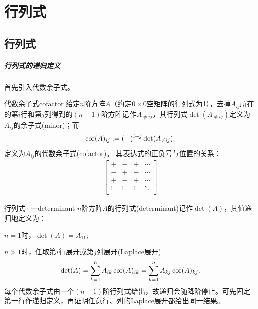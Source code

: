 \chapter{行列式}

\section{行列式}

\paragraph{行列式的递归定义}

首先引入代数余子式。

\begin{definition}{代数余子式}{cofactor}
	给定$n$阶方阵$A$（约定$0 \times 0$空矩阵的行列式为1），去掉$A_{ij}$所在的第$i$行和第$j$列得到的$(n - 1)$阶方阵记作$A_{\neq ij}$，其行列式$\det(A_{\neq ij})$定义为$A_{ij}$的余子式(minor)；而
	\begin{align}
		\operatorname{cof}(A)_{ij} := (-)^{i+j}\det(A_{\neq ij}).
	\end{align}
	定义为$A_{ij}$的代数余子式(cofactor)。
	其表达式的正负号与位置的关系：
	\begin{align*}
		\begin{bmatrix}
			+&-&+&\cdots\\
			-&+&-&\cdots\\
			+&-&+&\cdots\\
			\vdots&\vdots&\vdots&\ddots\\
		\end{bmatrix}
	\end{align*}
\end{definition}
\begin{definition}{行列式·一}{determinant}
	$n$阶方阵$A$的行列式(determinant)记作$\det(A)$，其值递归地定义为：
	\begin{compactenum}
		\item $n = 1$时，$\det(A) = A_{11};$
		\item $n > 1$时，任取第$i$行展开或第$j$列展开(Laplace展开)
		\begin{align}
			\det(A) = \sum_{k=1}^nA_{ik}\operatorname{cof}(A)_{ik} = \sum_{k=1}^nA_{kj}\operatorname{cof}(A)_{kj}.
		\end{align}
		每个代数余子式由一个$(n - 1)$阶行列式给出，故递归会随降阶停止。可先固定第一行作递归定义，再证明任意行、列的Laplace展开都给出同一结果。
	\end{compactenum}
\end{definition}

